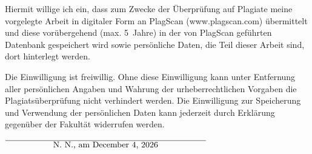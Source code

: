 \documentclass[12pt,twoside=false,a4paper,parskip]{scrbook}
\def\BaAuthor{Florian Ullmann}
\def\ShowBaAuthor{\BaAuthor}
\def\ShowBaAuthor{N.~N.}
\begin{document}

Hiermit willige ich ein, dass zum Zwecke der Überprüfung auf Plagiate meine vorgelegte Arbeit in digitaler Form an PlagScan (www.plagscan.com) übermittelt und diese vorübergehend (max. 5~Jahre) in der von PlagScan geführten Datenbank gespeichert wird sowie persönliche Daten, die Teil dieser Arbeit sind, dort hinterlegt werden.

\begin{small}
Die Einwilligung ist freiwillig. Ohne diese Einwilligung kann unter Entfernung aller persönlichen Angaben und Wahrung der urheberrechtlichen Vorgaben die Plagiatsüberprüfung nicht verhindert werden. Die Einwilligung zur Speicherung und Verwendung der persönlichen Daten kann jederzeit durch Erklärung gegenüber der Fakultät widerrufen werden.
\end{small}

\vspace{20pt}
\begin{flushright}
$\overline{~~~~~~~~~~~~~~~~~\mbox{\ShowBaAuthor, am \today}~~~~~~~~~~~~~~~~~}$
\end{flushright}
\end{document}
